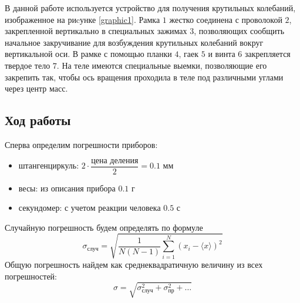 \documentclass[a4paper,12pt]{article}
\begin{document}
В данной работе используется устройство для получения крутильных колебаний, изображенное на риcунке \ref{graphic1}. Рамка $1$ жестко соединена с проволокой $2$, закрепленной вертикально в специальных зажимах $3$, позволяющих сообщить начальное закручивание для возбуждения крутильных колебаний вокруг вертикальной оси. В рамке с помощью планки $4$, гаек $5$ и винта $6$ закрепляется твердое тело $7$. На теле имеются специальные выемки, позволяющие его закрепить так, чтобы ось вращения проходила в теле под различными углами через центр масс.

\subsection*{Ход работы}
Сперва определим погрешности приборов:
	\begin{itemize}
		\item штангенциркуль: $2\cdot\dfrac{\text{цена деления}}{2} = 0.1$ мм
		\item весы: из описания прибора $0.1$ г
		\item секундомер: с учетом реакции человека $0.5$ с
	\end{itemize}
	Случайную погрешность будем определять по формуле
	$$
	\sigma_{\text{случ}} = \sqrt{\frac{1}{N(N - 1)}\sum_{i = 1}^{N}(x_i - \langle x\rangle)^2}
	$$
	Общую погрешность найдем как среднеквадратичную величину из всех погрешностей:
	$$
	\sigma = \sqrt{\sigma^2_{\text{случ}} + \sigma^2_{\text{пр}} + \dots}
	$$
\end{document}
